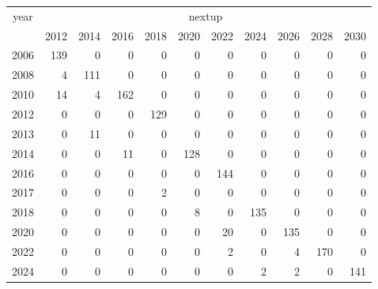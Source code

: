 \footnotesize\begin{tabular}[t]{lrrrrrrrrrr}
\toprule
\multicolumn{1}{c}{year} & \multicolumn{10}{c}{nextup} \\
\cmidrule(l{3pt}r{3pt}){1-1} \cmidrule(l{3pt}r{3pt}){2-11}
  & 2012 & 2014 & 2016 & 2018 & 2020 & 2022 & 2024 & 2026 & 2028 & 2030\\
\midrule
2006 & 139 & 0 & 0 & 0 & 0 & 0 & 0 & 0 & 0 & 0\\
2008 & 4 & 111 & 0 & 0 & 0 & 0 & 0 & 0 & 0 & 0\\
2010 & 14 & 4 & 162 & 0 & 0 & 0 & 0 & 0 & 0 & 0\\
2012 & 0 & 0 & 0 & 129 & 0 & 0 & 0 & 0 & 0 & 0\\
2013 & 0 & 11 & 0 & 0 & 0 & 0 & 0 & 0 & 0 & 0\\
2014 & 0 & 0 & 11 & 0 & 128 & 0 & 0 & 0 & 0 & 0\\
2016 & 0 & 0 & 0 & 0 & 0 & 144 & 0 & 0 & 0 & 0\\
2017 & 0 & 0 & 0 & 2 & 0 & 0 & 0 & 0 & 0 & 0\\
2018 & 0 & 0 & 0 & 0 & 8 & 0 & 135 & 0 & 0 & 0\\
2020 & 0 & 0 & 0 & 0 & 0 & 20 & 0 & 135 & 0 & 0\\
2022 & 0 & 0 & 0 & 0 & 0 & 2 & 0 & 4 & 170 & 0\\
2024 & 0 & 0 & 0 & 0 & 0 & 0 & 2 & 2 & 0 & 141\\
\bottomrule
\end{tabular}
